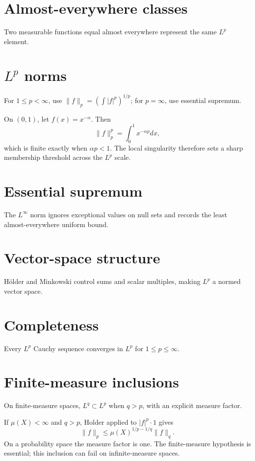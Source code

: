 \section{Almost-everywhere classes}
Two measurable functions equal almost everywhere represent the same $L^p$ element.

\section{$L^p$ norms}
For $1\le p<\infty$, use $\|f\|_p=(\int|f|^p)^{1/p}$; for $p=\infty$, use essential supremum.


\begin{example}\label{ex:iii06-expand-01}
On \((0,1)\), let \(f(x)=x^{-\alpha}\). Then
\[
\|f\|_p^p=\int_0^1x^{-\alpha p}dx,
\]
which is finite exactly when \(\alpha p<1\). The local singularity therefore
sets a sharp membership threshold across the \(L^p\) scale.
\end{example}
\section{Essential supremum}
The $L^\infty$ norm ignores exceptional values on null sets and records the least almost-everywhere uniform bound.

\section{Vector-space structure}
Hölder and Minkowski control sums and scalar multiples, making $L^p$ a normed vector space.

\section{Completeness}
Every $L^p$ Cauchy sequence converges in $L^p$ for $1\le p\le\infty$.

\section{Finite-measure inclusions}
On finite-measure spaces, $L^q\subset L^p$ when $q>p$, with an explicit measure factor.


\begin{example}\label{ex:iii06-expand-02}
If \(\mu(X)<\infty\) and \(q>p\), Holder applied to \(|f|^p\cdot1\) gives
\[
\|f\|_p\le \mu(X)^{1/p-1/q}\|f\|_q.
\]
On a probability space the measure factor is one. The finite-measure
hypothesis is essential; this inclusion can fail on infinite-measure spaces.
\end{example}
